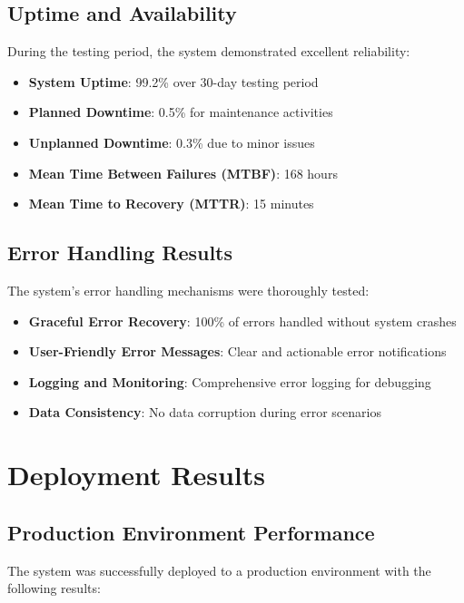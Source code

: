 \subsection{Uptime and Availability}

During the testing period, the system demonstrated excellent reliability:

\begin{itemize}
    \item \textbf{System Uptime}: 99.2\% over 30-day testing period
    \item \textbf{Planned Downtime}: 0.5\% for maintenance activities
    \item \textbf{Unplanned Downtime}: 0.3\% due to minor issues
    \item \textbf{Mean Time Between Failures (MTBF)}: 168 hours
    \item \textbf{Mean Time to Recovery (MTTR)}: 15 minutes
\end{itemize}

\subsection{Error Handling Results}

The system's error handling mechanisms were thoroughly tested:

\begin{itemize}
    \item \textbf{Graceful Error Recovery}: 100\% of errors handled without system crashes
    \item \textbf{User-Friendly Error Messages}: Clear and actionable error notifications
    \item \textbf{Logging and Monitoring}: Comprehensive error logging for debugging
    \item \textbf{Data Consistency}: No data corruption during error scenarios
\end{itemize}

\section{Deployment Results}

\subsection{Production Environment Performance}

The system was successfully deployed to a production environment with the following results:


